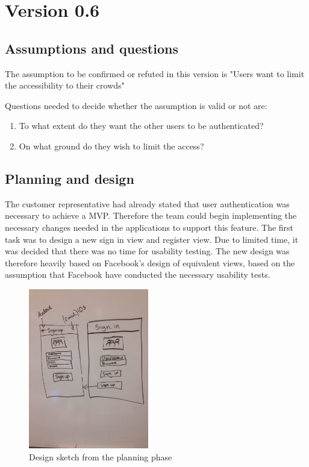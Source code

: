 \section{Version 0.6}
\subsection{Assumptions and questions}
The assumption to be confirmed or refuted in this version is "Users want to limit the accessibility to their crowds"

Questions needed to decide whether the assumption is valid or not are:

\begin{enumerate}
    \item To what extent do they want the other users to be authenticated?
    \item On what ground do they wish to limit the access?
\end{enumerate}
    
\subsection{Planning and design}

The customer representative had already stated that user authentication was necessary to achieve a \gls{MVP}. Therefore the team could begin implementing the necessary changes needed in the applications to support this feature. The first task was to design a new sign in view and register view. Due to limited time, it was decided that there was no time for usability testing. The new design was therefore heavily based on Facebook's design of equivalent views, based on the assumption that Facebook have conducted the necessary usability tests.


\begin{figure}
\centering
\includegraphics[height=7cm,angle=-90]{figs/v06/signin-whiteboard.jpg}
\caption{Design sketch from the planning phase}
\label{fig:design-sketch-6}
\end{figure}

